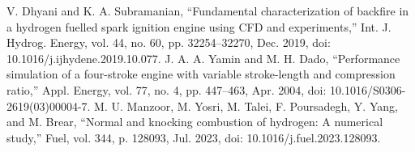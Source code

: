 \documentclass[conference]{IEEEtran}
\begin{document}
\begin{thebibliography}{00}
 V. Dhyani and K. A. Subramanian, “Fundamental characterization of backfire in a hydrogen fuelled spark ignition engine using CFD and experiments,” Int. J. Hydrog. Energy, vol. 44, no. 60, pp. 32254–32270, Dec. 2019, doi: 10.1016/j.ijhydene.2019.10.077.
 J. A. A. Yamin and M. H. Dado, “Performance simulation of a four-stroke engine with variable stroke-length and compression ratio,” Appl. Energy, vol. 77, no. 4, pp. 447–463, Apr. 2004, doi: 10.1016/S0306-2619(03)00004-7.
 M. U. Manzoor, M. Yosri, M. Talei, F. Poursadegh, Y. Yang, and M. Brear, “Normal and knocking combustion of hydrogen: A numerical study,” Fuel, vol. 344, p. 128093, Jul. 2023, doi: 10.1016/j.fuel.2023.128093.


\end{thebibliography}
\end{document}
